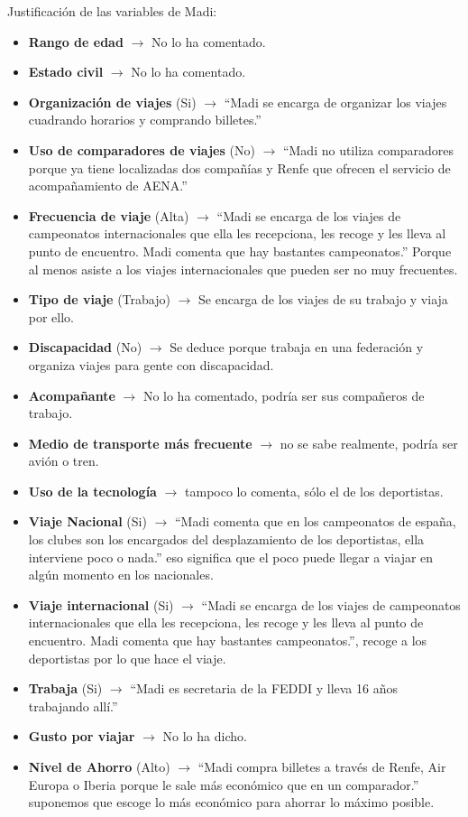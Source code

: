 \noindent Justificación de las variables de Madi:
\begin{itemize}
    \item \textbf{Rango de edad} $\rightarrow$ No lo ha comentado.
    \item \textbf{Estado civil} $\rightarrow$ No lo ha comentado.
    \item \textbf{Organización de viajes} (Si) $\rightarrow$ “Madi se encarga de organizar los viajes cuadrando horarios y comprando billetes.”
    \item \textbf{Uso de comparadores de viajes} (No) $\rightarrow$ “Madi no utiliza comparadores porque ya tiene localizadas dos compañías y Renfe que ofrecen el servicio de acompañamiento de AENA.”
    \item \textbf{Frecuencia de viaje} (Alta) $\rightarrow$ “Madi se encarga de los viajes de campeonatos internacionales que ella les recepciona, les recoge y les lleva al punto de encuentro. Madi comenta que hay bastantes campeonatos.” Porque al menos asiste a los viajes internacionales que pueden ser no muy frecuentes.
    \item \textbf{Tipo de viaje} (Trabajo) $\rightarrow$ Se encarga de los viajes de su trabajo y viaja por ello.
    \item \textbf{Discapacidad} (No) $\rightarrow$ Se deduce porque trabaja en una federación y organiza viajes para gente con discapacidad.
    \item \textbf{Acompañante} $\rightarrow$ No lo ha comentado, podría ser sus compañeros de trabajo.
    \item \textbf{Medio de transporte más frecuente} $\rightarrow$ no se sabe realmente, podría ser avión o tren.
    \item \textbf{Uso de la tecnología} $\rightarrow$ tampoco lo comenta, sólo el de los deportistas.
    \item \textbf{Viaje Nacional} (Si) $\rightarrow$ “Madi comenta que en los campeonatos de españa, los clubes son los encargados del desplazamiento de los deportistas, ella interviene poco o nada.” eso significa que el poco puede llegar a viajar en algún momento en los nacionales.
    \item \textbf{Viaje internacional} (Si) $\rightarrow$ “Madi se encarga de los viajes de campeonatos internacionales que ella les recepciona, les recoge y les lleva al punto de encuentro. Madi comenta que hay bastantes campeonatos.”, recoge a los deportistas por lo que hace el viaje.
    \item \textbf{Trabaja} (Si) $\rightarrow$ “Madi es secretaria de la FEDDI y lleva 16 años trabajando allí.”
    \item \textbf{Gusto por viajar} $\rightarrow$ No lo ha dicho.
    \item \textbf{Nivel de Ahorro} (Alto) $\rightarrow$ “Madi compra billetes a través de Renfe, Air Europa o Iberia porque le sale más económico que en un comparador.” suponemos que escoge lo más económico para ahorrar lo máximo posible.
\end{itemize}

